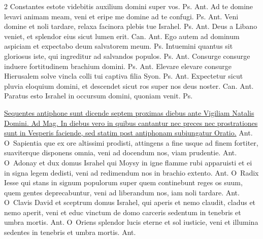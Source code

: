 \begin{multicols*}{2}
 Constantes estote videbitis auxilium domini super vos. {\color{Red} Ps.}  {\color{Red} Ant.} Ad te domine levavi animam meam, veni et eripe me domine ad te confugi. {\color{Red} Ps.}  {\color{Red} Ant.} Veni domine et noli tardare, relaxa facinora plebis tue Israhel. {\color{Red} Ps.}  {\color{Red} Ant.} Deus a Libano veniet, et splendor eius sicut lumen erit. {\color{Red} Can.}  {\color{Red} Ant.} Ego autem ad dominum aspiciam et expectabo deum salvatorem meum. {\color{Red} Ps.} 
 Intuemini quantus sit gloriosus iste, qui ingreditur ad salvandos populos. {\color{Red} Ps.}  {\color{Red} Ant.} Consurge consurge induere fortitudinem brachium domini. {\color{Red} Ps.}  {\color{Red} Ant.} Elevare elevare consurge Hierusalem solve vincla colli tui captiva filia Syon. {\color{Red} Ps.}  {\color{Red} Ant.} Expectetur sicut pluvia eloquium domini, et descendet sicut ros super nos deus noster. {\color{Red} Can.}  {\color{Red} Ant.} Paratus esto Israhel in occursum domini, quoniam venit. {\color{Red} Ps.} 
{\color{Red} }
\par \noindent \ul{Sequentes antiphone sunt dicende septem proximas diebus ante Vigiliam Natalis Domini. Ad Mag. In diebus vero in quibus cantantur nec preces nec prostrationes sunt in Vesperis faciende, sed statim post antiphonam subiungatur Oratio.} {\color{Red} Ant.}
\lettrine[lines=2]{\zallmancaps \color{Red} O}{}\ Sapientia que ex ore altissimi prodisti, attingens a fine usque ad finem fortiter, suaviterque disponens omnia, veni ad docendum nos, viam prudentie. {\color{Red} Ant.}
\lettrine[lines=2]{\zallmancaps \color{Blue} O}{}\ Adonay et dux domus Israhel qui Moysy in igne flamme rubi apparuisti et ei in signa legem dedisti, veni ad redimendum nos in brachio extento. {\color{Red} Ant.}
\lettrine[lines=2]{\zallmancaps \color{Red} O}{}\ Radix Iesse qui stans in signum populorum super quem continebunt reges os suum, quem gentes deprecabuntur, veni ad liberandum nos, iam noli tardare. {\color{Red} Ant.}
\lettrine[lines=2]{\zallmancaps \color{Blue} O}{}\ Clavis David et sceptrum domus Israhel, qui aperis et nemo claudit, cladus et nemo aperit, veni et educ vinctum de domo carceris sedentum in tenebris et umbra mortis. {\color{Red} Ant.}
\lettrine[lines=2]{\zallmancaps \color{Red} O}{}\ Oriens splendor lucis eterne et sol iusticie, veni et illumina sedentes in tenebris et umbra mortis. {\color{Red} Ant.}

\end{multicols*}
